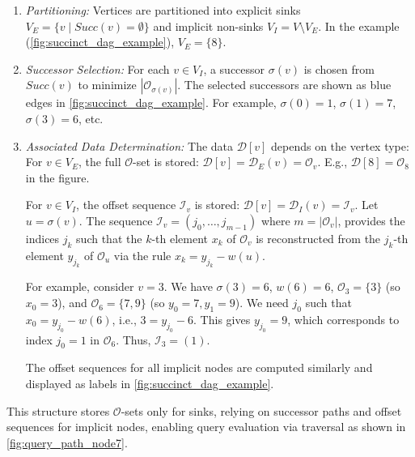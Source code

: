 \begin{enumerate}
    \item \emph{Partitioning:} Vertices are partitioned into explicit sinks $V_E = \{ v \mid Succ(v) = \emptyset \}$ and implicit non-sinks $V_I = V \setminus V_E$. In the example (\autoref{fig:succinct_dag_example}), $V_E=\{8\}$.

    \item \emph{Successor Selection:} For each $v \in V_I$, a successor $\sigma(v)$ is chosen from $Succ(v)$ to minimize $|\mathcal{O}_{\sigma(v)}|$. The selected successors are shown as blue edges in \autoref{fig:succinct_dag_example}. For example, $\sigma(0)=1$, $\sigma(1)=7$, $\sigma(3)=6$, etc.
    \item \emph{Associated Data Determination:} The data $\mathcal{D}[v]$ depends on the vertex type:
          For $v \in V_E$, the full $\mathcal{O}$-set is stored: $\mathcal{D}[v] = \mathcal{D}_E(v) = \mathcal{O}_v$. E.g., $\mathcal{D}[8] = \mathcal{O}_8$ in the figure.

          For $v \in V_I$, the offset sequence $\mathcal{I}_v$ is stored: $\mathcal{D}[v] = \mathcal{D}_I(v) = \mathcal{I}_v$. Let $u = \sigma(v)$. The sequence $\mathcal{I}_v = (j_0, \dots, j_{m-1})$ where $m=|\mathcal{O}_v|$, provides the indices $j_k$ such that the $k$-th element $x_k$ of $\mathcal{O}_v$ is reconstructed from the $j_k$-th element $y_{j_k}$ of $\mathcal{O}_u$ via the rule $x_k = y_{j_k} - w(u)$.

          For example, consider $v=3$. We have $\sigma(3)=6$, $w(6)=6$, $\mathcal{O}_3=\{3\}$ (so $x_0=3$), and $\mathcal{O}_6=\{7, 9\}$ (so $y_0=7, y_1=9$). We need $j_0$ such that $x_0 = y_{j_0} - w(6)$, i.e., $3 = y_{j_0} - 6$. This gives $y_{j_0}=9$, which corresponds to index $j_0=1$ in $\mathcal{O}_6$. Thus, $\mathcal{I}_3 = (1)$.

          The offset sequences for all implicit nodes are computed similarly and displayed as labels in \autoref{fig:succinct_dag_example}.
\end{enumerate}

This structure stores $\mathcal{O}$-sets only for sinks, relying on successor paths and offset sequences for implicit nodes, enabling query evaluation via traversal as shown in \autoref{fig:query_path_node7}.

